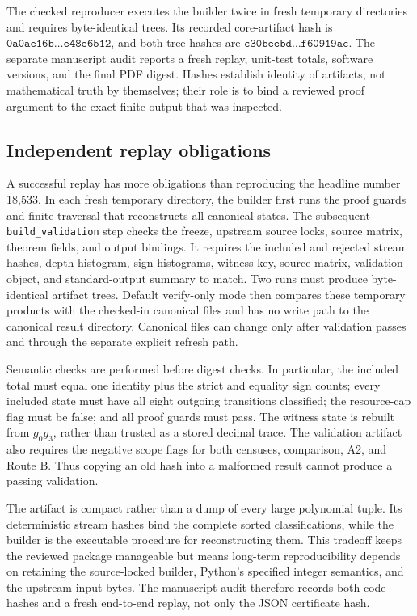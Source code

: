 \documentclass[11pt,a4paper]{article}
\theoremstyle{definition}
\begin{document}
The checked reproducer executes the builder twice in fresh temporary
directories and requires byte-identical trees.  Its recorded core-artifact
hash is
\(\texttt{0a0ae16b}\ldots\texttt{e48e6512}\), and both tree hashes are
\(\texttt{c30beebd}\ldots\texttt{f60919ac}\).  The separate manuscript audit
reports a fresh replay, unit-test totals, software versions, and the final PDF
digest.  Hashes establish identity of artifacts, not mathematical truth by
themselves; their role is to bind a reviewed proof argument to the exact
finite output that was inspected.

\subsection{Independent replay obligations}

A successful replay has more obligations than reproducing the headline
number 18,533.  In each fresh temporary directory, the builder first runs the
proof guards and finite traversal that reconstructs all canonical states.
The subsequent \texttt{build\_validation} step checks the freeze, upstream
source locks, source matrix, theorem fields, and output bindings.  It requires
the included and rejected stream hashes, depth histogram, sign histograms,
witness key, source matrix, validation object, and standard-output summary to
match.  Two runs must produce byte-identical artifact trees.  Default
verify-only mode then compares these temporary products with the checked-in
canonical files and has no write path to the canonical result directory.
Canonical files can change only after validation passes and through the
separate explicit refresh path.

Semantic checks are performed before digest checks.  In particular, the
included total must equal one identity plus the strict and equality sign
counts; every included state must have all eight outgoing transitions
classified; the resource-cap flag must be false; and all proof guards must
pass.  The witness state is rebuilt from \(g_0g_3\), rather than trusted as a
stored decimal trace.  The validation artifact also requires the negative
scope flags for both censuses, comparison, A2, and Route B.  Thus copying an
old hash into a malformed result cannot produce a passing validation.

The artifact is compact rather than a dump of every large polynomial tuple.
Its deterministic stream hashes bind the complete sorted classifications,
while the builder is the executable procedure for reconstructing them.  This
tradeoff keeps the reviewed package manageable but means long-term
reproducibility depends on retaining the source-locked builder, Python's
specified integer semantics, and the upstream input bytes.  The manuscript
audit therefore records both code hashes and a fresh end-to-end replay, not
only the JSON certificate hash.
\end{document}
